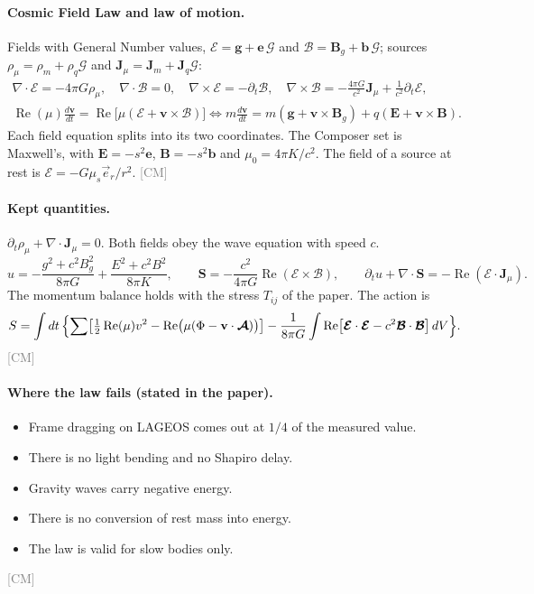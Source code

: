 \documentclass[11pt]{article}
\newcommand{\Gp}{\mathcal{G}}
\newcommand{\uE}{\boldsymbol{\mathcal{E}}}
\newcommand{\uB}{\boldsymbol{\mathcal{B}}}
\newcommand{\vv}{\mathbf{v}}
\newcommand{\vg}{\mathbf{g}}
\newcommand{\ve}{\mathbf{e}}
\newcommand{\vE}{\mathbf{E}}
\newcommand{\vB}{\mathbf{B}}
\renewcommand{\Re}{\operatorname{Re}}
\newcommand{\src}[1]{\hfill{\small\textcolor{gray}{[#1]}}}
\begin{document}
\paragraph{Cosmic Field Law and law of motion.} Fields with General Number values,
$\uE = \vg + \ve\,\Gp$ and $\uB = \vB_g + \mathbf b\,\Gp$; sources
$\rho_\mu = \rho_m+\rho_q\Gp$ and $\mathbf J_\mu = \mathbf J_m+\mathbf J_q\Gp$:
\begin{gather*}
\nabla\cdot\uE = -4\pi G\rho_\mu,\quad \nabla\cdot\uB = 0,\quad \nabla\times\uE = -\partial_t\uB,\quad
\nabla\times\uB = -\frac{4\pi G}{c^2}\mathbf J_\mu + \frac{1}{c^2}\partial_t\uE,\\
\Re(\mu)\frac{d\vv}{dt} = \Re\bigl[\mu(\uE+\vv\times\uB)\bigr]
\iff m\frac{d\vv}{dt} = m(\vg+\vv\times\vB_g) + q(\vE+\vv\times\vB).
\end{gather*}
Each field equation splits into its two coordinates. The Composer set is Maxwell's, with $\vE = -s^2\ve$, $\vB = -s^2\mathbf b$ and $\mu_0 = 4\pi K/c^2$. The field of a source at rest is $\uE = -G\mu_s\vec e_r/r^2$. \src{CM}

\paragraph{Kept quantities.}
$\partial_t\rho_\mu + \nabla\cdot\mathbf J_\mu = 0$. Both fields obey the wave equation with speed $c$.
\[
u = -\frac{g^2+c^2B_g^2}{8\pi G} + \frac{E^2+c^2B^2}{8\pi K},\qquad
\mathbf S = -\frac{c^2}{4\pi G}\Re(\uE\times\uB),\qquad \partial_tu + \nabla\cdot\mathbf S = -\Re(\uE\cdot\mathbf J_\mu).
\]
The momentum balance holds with the stress $T_{ij}$ of the paper. The action is
\[
S = \int dt\,\Bigl\{\sum\bigl[\tfrac12\Re(\mu)v^2 - \Re\bigl(\mu(\Phi-\vv\cdot\boldsymbol{\mathcal A})\bigr)\bigr]
- \frac{1}{8\pi G}\int\Re\bigl[\uE\cdot\uE - c^2\uB\cdot\uB\bigr]\,dV\Bigr\}.
\]\src{CM}

\paragraph{Where the law fails (stated in the paper).}
\begin{itemize}
\item Frame dragging on LAGEOS comes out at $1/4$ of the measured value.
\item There is no light bending and no Shapiro delay.
\item Gravity waves carry negative energy.
\item There is no conversion of rest mass into energy.
\item The law is valid for slow bodies only.
\end{itemize}
\src{CM}
\end{document}
